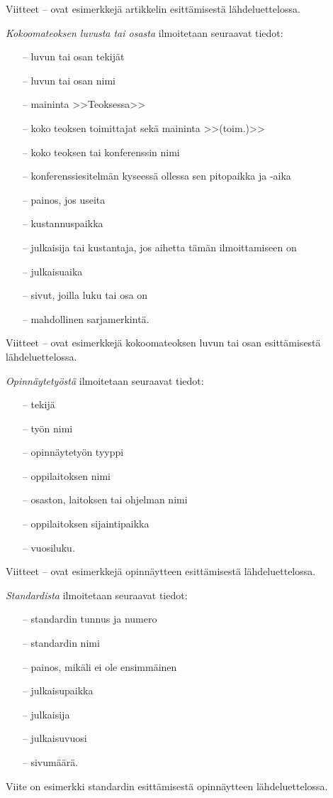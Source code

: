 \documentclass[finnish, 12pt, a4paper, sci, utf8, pdfa]{aaltothesis}
\begin{document}
Viitteet \cite{bcs}--\cite{Deschamps} ovat esimerkkejä artikkelin
esittämisestä lähdeluettelossa.

\textit{Kokoomateoksen luvusta tai osasta} ilmoitetaan seuraavat tiedot:

\begin{itemize}
\item[--]luvun tai osan tekijät
\item[--]luvun tai osan nimi
\item[--]maininta >>Teoksessa>>
\item[--]koko teoksen toimittajat sekä maininta >>(toim.)>>
\item[--]koko teoksen tai konferenssin nimi
\item[--]konferenssiesitelmän kyseessä ollessa sen pitopaikka ja -aika
\item[--]painos, jos useita
\item[--]kustannuspaikka
\item[--]julkaisija tai kustantaja, jos aihetta tämän ilmoittamiseen on
\item[--]julkaisuaika
\item[--]sivut, joilla luku tai osa on 
\item[--]mahdollinen sarjamerkintä.
\end{itemize}

Viitteet \cite{Sihvola}--\cite{Lindblom} ovat esimerkkejä
kokoomateoksen luvun tai osan esittämisestä lähdeluettelossa. 

\textit{Opinnäytetyöstä} ilmoitetaan seuraavat tiedot:

\begin{itemize}
\item[--]tekijä
\item[--]työn nimi
\item[--]opinnäytetyön tyyppi
\item[--]oppilaitoksen nimi
\item[--]osaston, laitoksen tai ohjelman nimi
\item[--]oppilaitoksen sijaintipaikka
\item[--]vuosiluku.
\end{itemize}

Viitteet \cite{Miinusmaa}--\cite{Lonnqvist} ovat esimerkkejä
opinnäytteen esittämisestä lähdeluettelossa. 

\textit{Standardista} ilmoitetaan seuraavat tiedot:

\begin{itemize}
\item[--]standardin tunnus ja numero
\item[--]standardin nimi
\item[--]painos, mikäli ei ole ensimmäinen
\item[--]julkaisupaikka
\item[--]julkaisija
\item[--]julkaisuvuosi
\item[--]sivumäärä.
\end{itemize}
Viite \cite{sfs} on esimerkki standardin esittämisestä opinnäytteen
lähdeluettelossa. 
\end{document}
